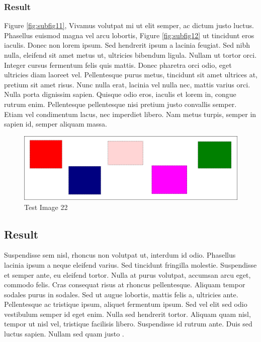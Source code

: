 \subsubsection{Result}
Figure \ref{fig:subfig11}, Vivamus volutpat mi ut elit semper, ac dictum justo luctus. Phasellus euismod
magna vel arcu lobortis, Figure \ref{fig:subfig12} ut tincidunt eros iaculis. Donec non lorem ipsum. Sed
hendrerit ipsum a lacinia feugiat. Sed nibh nulla, eleifend sit amet metus ut,
ultricies bibendum ligula. Nullam ut tortor orci. Integer cursus fermentum
felis quis mattis. Donec pharetra orci odio, eget ultricies diam laoreet vel.
Pellentesque purus metus, tincidunt sit amet ultrices at, pretium sit amet
risus. Nunc nulla erat, lacinia vel nulla nec, mattis varius orci. Nulla porta
dignissim sapien. Quisque odio eros, iaculis et lorem in, congue rutrum enim.
Pellentesque pellentesque nisi pretium justo convallis semper. Etiam vel
condimentum lacus, nec imperdiet libero. Nam metus turpis, semper in sapien id,
semper aliquam massa.

\begin{figure}[h]
    \centering
    \includegraphics[width=\textwidth]{figures/test_image}
    \caption{Test Image 22}
    \label{fig:test_image22}
\end{figure}

\subsection{Result}
Suspendisse sem nisl, rhoncus non volutpat ut, interdum id odio. Phasellus
lacinia ipsum a neque eleifend varius. Sed tincidunt fringilla molestie.
Suspendisse et semper ante, eu eleifend tortor. Nulla at purus volutpat,
accumsan arcu eget, commodo felis. Cras consequat risus at rhoncus
pellentesque. Aliquam tempor sodales purus in sodales. Sed ut augue lobortis,
mattis felis a, ultricies ante. Pellentesque ac tristique ipsum, aliquet
fermentum ipsum. Sed vel elit sed odio vestibulum semper id eget enim. Nulla
sed hendrerit tortor. Aliquam quam nisl, tempor ut nisl vel, tristique
facilisis libero. Suspendisse id rutrum ante. Duis sed luctus sapien. Nullam
sed quam justo \cite{web:website}.

